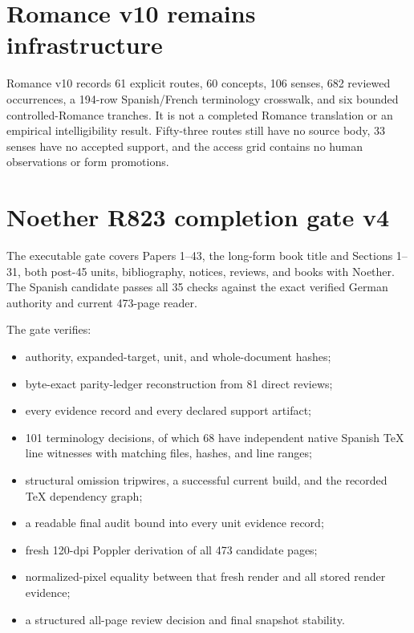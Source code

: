 \documentclass[10pt,a4paper]{article}
\begin{document}
\section*{Romance v10 remains infrastructure}

Romance v10 records 61 explicit routes, 60 concepts, 106 senses, 682 reviewed
occurrences, a 194-row Spanish/French terminology crosswalk, and six bounded
controlled-Romance tranches. It is not a completed Romance translation or an
empirical intelligibility result. Fifty-three routes still have no source body,
33 senses have no accepted support, and the access grid contains no human
observations or form promotions.

\newpage
\section*{Noether R823 completion gate v4}

The executable gate covers Papers 1--43, the long-form book title and Sections
1--31, both post-45 units, bibliography, notices, reviews, and books with
Noether. The Spanish candidate passes all 35 checks against the exact verified
German authority and current 473-page reader.

The gate verifies:

\begin{itemize}
  \item authority, expanded-target, unit, and whole-document hashes;
  \item byte-exact parity-ledger reconstruction from 81 direct reviews;
  \item every evidence record and every declared support artifact;
  \item 101 terminology decisions, of which 68 have independent native Spanish
        TeX line witnesses with matching files, hashes, and line ranges;
  \item structural omission tripwires, a successful current build, and the
        recorded TeX dependency graph;
  \item a readable final audit bound into every unit evidence record;
  \item fresh 120-dpi Poppler derivation of all 473 candidate pages;
  \item normalized-pixel equality between that fresh render and all stored
        render evidence;
  \item a structured all-page review decision and final snapshot stability.
\end{itemize}
\end{document}
